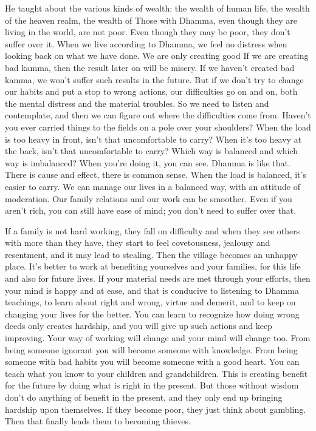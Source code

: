 He taught about the various kinds of wealth: the wealth of human life, the wealth of the heaven realm, the wealth of  Those with Dhamma, even though they are living in the world, are not poor. Even though they may be poor, they don't suffer over it. When we live according to Dhamma, we feel no distress when looking back on what we have done. We are only creating good  If we are creating bad kamma, then the result later on will be misery. If we haven't created bad kamma, we won't suffer such results in the future. But if we don't try to change our habits and put a stop to wrong actions, our difficulties go on and on, both the mental distress and the material troubles. So we need to listen and contemplate, and then we can figure out where the difficulties come from. Haven't you ever carried things to the fields on a pole over your shoulders? When the load is too heavy in front, isn't that uncomfortable to carry? When it's too heavy at the back, isn't that uncomfortable to carry? Which way is balanced and which way is imbalanced? When you're doing it, you can see. Dhamma is like that. There is cause and effect, there is common sense. When the load is balanced, it's easier to carry. We can manage our lives in a balanced way, with an attitude of moderation. Our family relations and our work can be smoother. Even if you aren't rich, you can still have ease of mind; you don't need to suffer over that. 

If a family is not hard working, they fall on difficulty and when they see others with more than they have, they start to feel covetousness, jealousy and resentment, and it may lead to stealing. Then the village becomes an unhappy place. It's better to work at benefiting yourselves and your families, for this life and also for future lives. If your material needs are met through your efforts, then your mind is happy and at ease, and that is conducive to listening to Dhamma teachings, to learn about right and wrong, virtue and demerit, and to keep on changing your lives for the better. You can learn to recognize how doing wrong deeds only creates hardship, and you will give up such actions and keep improving. Your way of working will change and your mind will change too. From being someone ignorant you will become someone with knowledge. From being someone with bad habits you will become someone with a good heart. You can teach what you know to your children and grandchildren. This is creating benefit for the future by doing what is right in the present. But those without wisdom don't do anything of benefit in the present, and they only end up bringing hardship upon themselves. If they become poor, they just think about gambling. Then that finally leads them to becoming thieves. 

